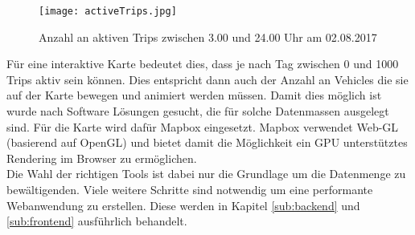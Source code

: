 \begin{newpage}
      \begin{figure}[htbp]
        \begin{center}
          \texttt{[image: activeTrips.jpg]}
          \caption{Anzahl an aktiven Trips zwischen 3.00 und 24.00 Uhr am 02.08.2017}
          \label{fig:activeTrips}
        \end{center}
      \end{figure}

      Für eine interaktive Karte bedeutet dies, dass je nach Tag zwischen 0 und 1000 Trips aktiv sein können. Dies entspricht dann auch der Anzahl an Vehicles die sie auf der Karte bewegen und animiert werden müssen. Damit dies möglich ist wurde nach Software Lösungen gesucht, die für solche Datenmassen ausgelegt sind. Für die Karte wird dafür Mapbox eingesetzt. Mapbox verwendet Web-GL (basierend auf OpenGL) und bietet damit die Möglichkeit ein GPU unterstütztes Rendering im Browser zu ermöglichen.\\

      Die Wahl der richtigen Tools ist dabei nur die Grundlage um die Datenmenge zu bewältigenden. Viele weitere Schritte sind notwendig um eine performante Webanwendung zu erstellen. Diese werden in Kapitel \ref{sub:backend}  und \ref{sub:frontend}  ausführlich behandelt.
        
\end{newpage}